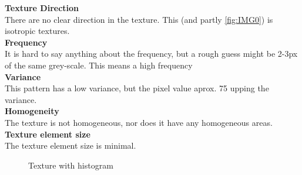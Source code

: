 \documentclass{article}
\begin{document}
\textbf{Texture Direction}\\
There are no clear direction in the texture. This (and partly \ref{fig:IMG0}) is isotropic textures.
\\ 
 
\textbf{Frequency} \\
It is hard to say anything about the frequency, but a rough guess might be 2-3px of the same grey-scale. This means a high frequency\\ 


\textbf{Variance}\\
This pattern has a low variance, but the pixel value aprox. 75 upping the variance.
\\

\textbf{Homogeneity}\\
The texture is not homogeneous, nor does it have any homogeneous areas.\\

\textbf{Texture element size}\\
The texture element size is minimal.
\\

\begin{figure}[h]%
	\centering
    \qquad
    \caption{Texture with histogram}%
    \label{fig:IMG3}%
\end{figure}









\newpage
\end{document}
